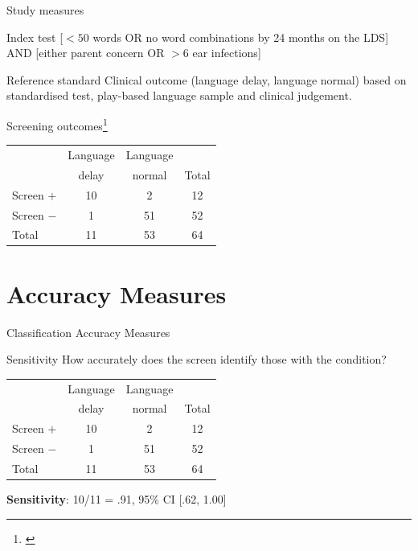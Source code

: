 \documentclass{beamer}
\begin{document}
\begin{frame}{Study measures}
	\begin{block}{Index test}
	[$<50$ words OR no word combinations by 24 months on the LDS]\\
	AND 
	[either parent concern OR $>6$ ear infections]
	\end{block}
	
	\begin{block}{Reference standard}
	Clinical outcome (language delay, language normal) based on standardised test, play-based language sample and clinical judgement. 
	\end{block}
\end{frame}

\begin{frame}{Screening outcomes\footnote{\tiny{\citet{Klee2000a, Klee2008a}}}}
\begin{center}
\begin{tabular}{l | c | c | c}
\toprule
& Language & Language & \\
& delay & normal & Total \\ 
\hline
Screen $+$ & 10 & 2 & 12 \\
\hline
Screen $-$ & 1 & 51 & 52 \\
\hline
Total & 11 & 53 & 64 \\
\bottomrule
\end{tabular}
\end{center}
\end{frame}

\section{Accuracy Measures}

\begin{frame}
\begin{center}
\Huge{Classification Accuracy Measures}
\end{center}
\end{frame}

\begin{frame}{Sensitivity}
How accurately does the screen identify those \alert{with} the condition? \\

\begin{center}
\begin{tabular}{l | c | c | c}
\toprule
& Language & Language & \\
& delay & normal & Total \\ 
\hline
Screen $+$ & \alert{10} & 2 & 12 \\
\hline
Screen $-$ & \alert{1} & 51 & 52 \\
\hline
Total & \alert{11} & 53 & 64 \\
\bottomrule
\end{tabular}
\end{center}

\begin{center}
\textbf{Sensitivity}: 10/11 = .91, 95\% CI [.62, 1.00]
\end{center}
\end{frame}
\end{document}
